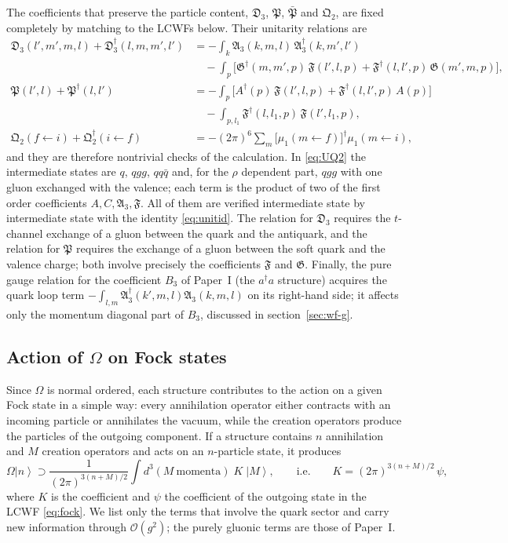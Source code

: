 \documentclass[11pt,a4paper]{article}
\numberwithin{equation}{section}
\newcommand{\mf}[1]{\mathfrak{#1}}
\newcommand{\dg}{\dagger}
\newcommand{\ket}[1]{\left|#1\right\rangle}
\newcommand{\OM}{\Omega}
\newcommand{\order}[1]{\mathcal{O}(#1)}
\begin{document}
The coefficients that preserve the particle content, $\mf D_{3}$, $\mf P$, $\bar{\mf P}$ and
$\mf Q_{2}$, are fixed completely by matching to the LCWFs below. Their unitarity relations are
\begin{align}
\mf D_{3}(l',m',m,l)+\mf D_{3}^{\dg}(l,m,m',l')&=
-\int_{k}\mf A_{3}(k,m,l)\,\mf A_{3}^{\dg}(k,m',l')
\nonumber\\
&\quad-\int_{p}\Big[\mf G^{\dg}(m,m',p)\,\mf F(l',l,p)+\mf F^{\dg}(l,l',p)\,\mf G(m',m,p)\Big],
\label{eq:UD3}\\[3pt]
\mf P(l',l)+\mf P^{\dg}(l,l')&=-\int_{p}\Big[A^{\dg}(p)\,\mf F(l',l,p)+\mf F^{\dg}(l,l',p)\,A(p)\Big]
\nonumber\\
&\quad-\int_{p,l_{1}}\mf F^{\dg}(l,l_{1},p)\,\mf F(l',l_{1},p),
\label{eq:UP}\\[3pt]
\mf Q_{2}(f\leftarrow i)+\mf Q_{2}^{\dg}(i\leftarrow f)&=-(2\pi)^{6}\sum_{m}\big[\mu_{1}(m\leftarrow f)\big]^{\dg}\mu_{1}(m\leftarrow i),
\label{eq:UQ2}
\end{align}
and they are therefore nontrivial checks of the calculation. In \eqref{eq:UQ2} the intermediate
states are $q$, $qgg$, $qq\bar q$ and, for the $\rho$ dependent part, $qgg$ with one gluon
exchanged with the valence; each term is the product of two of the first order coefficients
$A,C,\mf A_{3},\mf F$. All of them are verified intermediate state by intermediate state with the
identity \eqref{eq:unitid}. The relation for $\mf D_{3}$ requires the $t$-channel exchange of a
gluon between the quark and the antiquark, and the relation for $\mf P$ requires the exchange of a
gluon between the soft quark and the valence charge; both involve precisely the coefficients
$\mf F$ and $\mf G$. Finally, the pure gauge relation for the coefficient $B_{3}$ of Paper~I (the $a^{\dg}a$
structure) acquires the quark loop term $-\int_{l,m}\mf A_{3}^{\dg}(k',m,l)\mf A_{3}(k,m,l)$ on its
right-hand side; it affects only the momentum diagonal part of $B_{3}$, discussed in
section~\ref{sec:wf-g}.

\subsection*{Action of $\OM$ on Fock states}
\label{sec:action}

Since $\OM$ is normal ordered, each structure contributes to the action on a given Fock state in
a simple way: every annihilation operator either contracts with an incoming particle or
annihilates the vacuum, while the creation operators produce the particles of the outgoing
component. If a structure contains $n$ annihilation and $M$ creation operators and acts on an
$n$-particle state, it produces
\begin{equation}
\OM\ket{n}\supset\frac{1}{(2\pi)^{3(n+M)/2}}\int\!d^{3}(M\ \text{momenta})\;K\;\ket{M},
\qquad\text{i.e.}\qquad K=(2\pi)^{3(n+M)/2}\,\psi,
\label{eq:rule}
\end{equation}
where $K$ is the coefficient and $\psi$ the coefficient of the outgoing state in the LCWF
\eqref{eq:fock}. We list only the terms that involve the quark sector and carry new information
through $\order{g^{2}}$; the purely gluonic terms are those of Paper~I.
\end{document}

